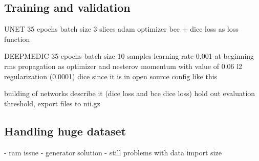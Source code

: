 \subsection{Training and validation}

UNET
35 epochs
batch size 3 slices
adam optimizer
bce + dice loss as loss function

DEEPMEDIC
35 epochs
batch size 10 samples
learning rate 0.001 at beginning
rms propagation as optimizer and nesterov momentum with value of 0.06
l2 regularization (0.0001)
dice since it is in open source config like this



building of networks
describe it (dice loss and bce dice loss)
hold out evaluation
threshold, export files to nii.gz

\subsection{Handling huge dataset}
- ram issue
- generator solution
- still problems with data import size